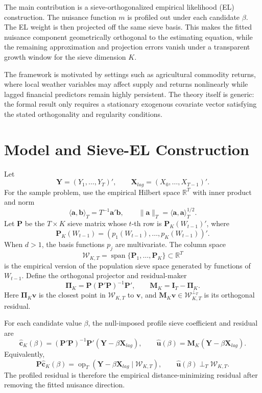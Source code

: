 ﻿\documentclass[11pt]{article}
\begin{document}
The main contribution is a sieve-orthogonalized empirical likelihood (EL) construction. The nuisance function \(m\) is profiled out under each candidate \(\beta\). The EL weight is then projected off the same sieve basis. This makes the fitted nuisance component geometrically orthogonal to the estimating equation, while the remaining approximation and projection errors vanish under a transparent growth window for the sieve dimension \(K\).

The framework is motivated by settings such as agricultural commodity returns, where local weather variables may affect supply and returns nonlinearly while lagged financial predictors remain highly persistent. The theory itself is generic: the formal result only requires a stationary exogenous covariate vector satisfying the stated orthogonality and regularity conditions.

\section{Model and Sieve-EL Construction}

Let
\[
    \bm Y=(Y_1,\ldots,Y_T)',\qquad
    \bm X_{lag}=(X_0,\ldots,X_{T-1})'.
\]
For the sample problem, use the empirical Hilbert space \(\mathbb R^T\) with inner product and norm
\[
    \langle \bm a,\bm b\rangle_T=T^{-1}\bm a'\bm b,
    \qquad
    \|\bm a\|_T=\langle \bm a,\bm a\rangle_T^{1/2}.
\]
Let \(\bm P\) be the \(T\times K\) sieve matrix whose \(t\)-th row is \(\bm P_K(W_{t-1})'\), where
\[
    \bm P_K(W_{t-1})=(p_1(W_{t-1}),\ldots,p_K(W_{t-1}))'.
\]
When \(d>1\), the basis functions \(p_j\) are multivariate. The column space
\[
    \mathcal W_{K,T}=\operatorname{span}\{\bm P_1,\ldots,\bm P_K\}\subset\mathbb R^T
\]
is the empirical version of the population sieve space generated by functions of \(W_{t-1}\). Define the orthogonal projector and residual-maker
\[
    \bm\Pi_K=\bm P(\bm P'\bm P)^{-1}\bm P',
    \qquad
    \bm M_K=\bm I_T-\bm\Pi_K.
\]
Here \(\bm\Pi_K\bm v\) is the closest point in \(\mathcal W_{K,T}\) to \(\bm v\), and \(\bm M_K\bm v\in\mathcal W_{K,T}^{\perp_T}\) is its orthogonal residual.

For each candidate value \(\beta\), the null-imposed profile sieve coefficient and residual are
\begin{equation}
    \widehat{\bm c}_K(\beta)
    =(\bm P'\bm P)^{-1}\bm P'(\bm Y-\beta\bm X_{lag}),
    \qquad
    \widehat{\bm u}(\beta)=\bm M_K(\bm Y-\beta\bm X_{lag}).
    \label{eq:geo-profile-sieve}
\end{equation}
Equivalently,
\[
    \bm P\widehat{\bm c}_K(\beta)
       =\operatorname{op}_T(\bm Y-\beta\bm X_{lag}\mid\mathcal W_{K,T}),
    \qquad
    \widehat{\bm u}(\beta)\perp_T\mathcal W_{K,T}.
\]
The profiled residual is therefore the empirical distance-minimizing residual after removing the fitted nuisance direction.
\end{document}
